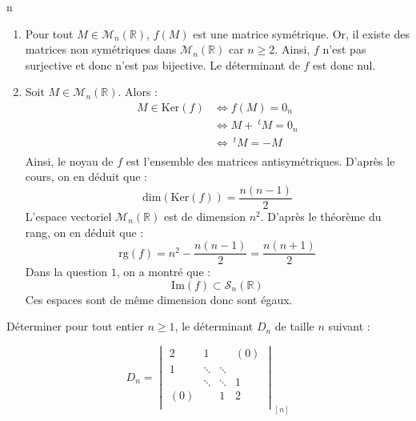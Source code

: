 n\documentclass[a4paper,10pt]{report}
\begin{document}
\begin{enumerate}
\item Pour tout $M \in \mathcal{M}_n(\mathbb{R})$, $f(M)$ est une matrice symétrique. Or, il existe des matrices non symétriques dans $\mathcal{M}_n(\mathbb{R})$ car $n \geq 2$. Ainsi, $f$ n'est pas surjective et donc n'est pas bijective. Le déterminant de $f$ est donc nul.
\item Soit $M \in \mathcal{M}_n(\mathbb{R})$. Alors :
\begin{align*}
M \in \textrm{Ker}(f) & \Longleftrightarrow f(M)=0_n \\
& \Longleftrightarrow M+~^tM= 0_n \\
& \Longleftrightarrow ~^tM=-M \\
\end{align*}
Ainsi, le noyau de $f$ est l'ensemble des matrices antisymétriques. D'après le cours, on en déduit que :
$$ \textrm{dim}(\textrm{Ker}(f)) = \dfrac{n(n-1)}{2}$$
L'espace vectoriel $\mathcal{M}_n(\mathbb{R})$ est de dimension $n^2$. D'après le théorème du rang, on en déduit que :
$$ \textrm{rg}(f) = n^2 - \dfrac{n(n-1)}{2} = \dfrac{n(n+1)}{2}$$
Dans la question $1$, on a montré que :
$$ \textrm{Im}(f) \subset \mathcal{S}_n(\mathbb{R})$$
Ces espaces sont de même dimension donc sont égaux.
\end{enumerate}

\begin{Exa} Déterminer pour tout entier $n \geq 1$, le déterminant $D_n$ de taille $n$ suivant :

\[
    D_n =
    \begin{vmatrix}
        2 & 1 & {} & {(0)} \\
        1 & \ddots & \ddots & {} \\
        {} & \ddots & \ddots & 1 \\
        {(0)} & {} & 1 & 2 \\
    \end{vmatrix}_{[n]}
    \]
\end{Exa} 
\end{document}

